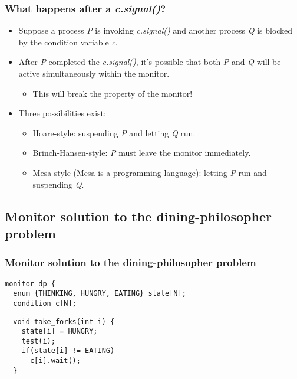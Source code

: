 \documentclass[CJKutf8,dvipsnames,table]{beamer}
\begin{document}
\begin{CJK*}{UTF8}{song}
  \begin{frame}
  \frametitle{What happens after a \emph{c.signal()}?} \pause
  \begin{itemize}
  \item{Suppose a process \emph{P} is invoking \emph{c.signal()} and another
    process \emph{Q} is blocked by the condition variable \emph{c}.} \pause
  \item{After \emph{P} completed the \emph{c.signal()}, it's possible that
    both \emph{P} and \emph{Q} will be active simultaneously within the monitor.} \pause
    \begin{itemize}
    \item{This will break the property of the monitor!} \pause
    \end{itemize}
  \item{Three possibilities exist:} \pause
    \begin{itemize}
    \item{Hoare-style: suspending \emph{P} and letting \emph{Q} run.} \pause
    \item{Brinch-Hansen-style: \emph{P} must leave the monitor immediately.} \pause
    \item{Mesa-style (Mesa is a programming language): letting \emph{P} run and suspending \emph{Q}.}
    \end{itemize}
  \end{itemize}
  \end{frame}

  \subsection{Monitor solution to the dining-philosopher problem}

  \begin{frame}[fragile]
  \frametitle{Monitor solution to the dining-philosopher problem} \pause

\begin{lstlisting}
monitor dp {
  enum {THINKING, HUNGRY, EATING} state[N];
  condition c[N];
\end{lstlisting}

  \begin{minipage}[c]{0.5\textwidth}
\begin{lstlisting}
  void take_forks(int i) {
    state[i] = HUNGRY;
    test(i);
    if(state[i] != EATING)
      c[i].wait();
  }
\end{lstlisting}

  \end{minipage}%
  \begin{minipage}[c]{0.5\textwidth}


\end{minipage}
\end{frame}
\end{CJK*}
\end{document}
